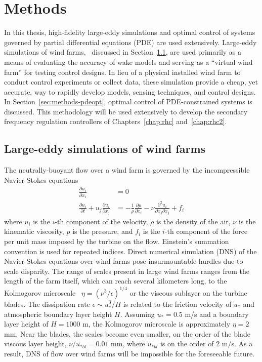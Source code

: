 \chapter{Methods}
\label{chap:methods}

In this thesis, high-fidelity large-eddy simulations and optimal control of systems governed by partial differential equations (PDE) are used extensively. Large-eddy simulations of wind farms,~\cite{Calaf2010a, Meyers2010a, Wu2011a, Wu2012a, Cater2012a, Churchfield2012a, Wu2013a, Stevens2014a, Stevens2014b, Stevens2014c, VerHulst2014a, Goit2015a, Wu2015a, Munters2016a, Munters2017a, Stevens2018a, Martinez2018a, Allaerts2018a} discussed in Section~\ref{sec:methods-les}, are used primarily as a means of evaluating the accuracy of wake models and serving as a ``virtual wind farm'' for testing control designs. In lieu of a physical installed wind farm to conduct control experiments or collect data, these simulation provide a cheap, yet accurate, way to rapidly develop models, sensing techniques, and control designs. In Section~\ref{sec:methods-pdeopt}, optimal control of PDE-constrained systems is discussed. This methodology will be used extensively to develop the secondary frequency regulation controllers of Chapters~\ref{chap:rhc} and~\ref{chap:rhc2}. 

\section{Large-eddy simulations of wind farms}
\label{sec:methods-les}

The neutrally-buoyant flow over a wind farm is governed by the incompressible Navier-Stokes equations
\begin{align}
\frac{\partial u_i}{\partial x_i} &= 0 \\
\frac{\partial u_i}{\partial t} + u_j \frac{\partial u_i}{\partial x_j} &= - \frac{1}{\rho} \frac{\partial p}{\partial x_i}   - \nu \frac{\partial^2 u_i}{\partial x_j \partial x_j} + f_i
\end{align}
where $u_i$ is the $i$-th component of the velocity, $\rho$ is the density of the air,  $\nu$ is the kinematic viscosity, $p$ is the pressure, and $f_i$ is the $i$-th component of the force per unit mass imposed by the turbine on the flow. Einstein's summation convention is used for repeated indices. Direct numerical simulation (DNS) of the Navier-Stokes equations over wind farms pose insurmountable hurdles due to scale disparity. The range of scales present in large wind farms ranges from the length of the farm itself, which can reach several kilometers long, to the Kolmogorov microscale~\cite{Tennekes1972a} $\eta = (\nu^3/\epsilon)^{1/4}$ or the viscous sublayer on the turbine blades. The dissipation rate $\epsilon \sim u_*^3/H$ is related to the friction velocity of $u_*$ and  atmospheric boundary layer height $H$. Assuming $u_*= 0.5$ m/s and a boundary layer height of $H = 1000$ m, the Kolmogorov microscale is approximately $\eta = 2$ mm. Near the blades, the scales become even smaller, on the order of the blade viscous layer height, $\nu/u_{*bl} = 0.01$ mm, where $u_{*bl}$ is on the order of 2 m/s. As a result, DNS of flow over wind farms will be impossible for the foreseeable future. 

